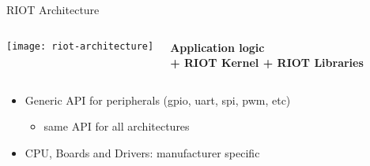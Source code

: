 \documentclass[aspectratio=169]{beamer}
\begin{document}
\begin{frame}{RIOT Architecture}
\begin{columns}

\begin{block}{}
\texttt{[image: riot-architecture]}
\end{block}


\textbf{Application logic\\
{\Large +} RIOT Kernel
{\Large +} RIOT Libraries}

\vspace{1.2cm}

\end{columns}

\vspace{.5cm}

\begin{itemize}

\item Generic API for peripherals (gpio, uart, spi, pwm, etc)

\begin{itemize}

\item same API for all architectures

\end{itemize}

\item CPU, Boards and Drivers: manufacturer specific

\end{itemize}

\vspace{2cm}
\end{frame}
\end{document}
